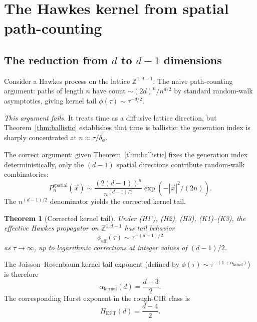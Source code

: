 \documentclass[11pt,a4paper]{article}
\newtheorem{theorem}{Theorem}
\begin{document}
\section{The Hawkes kernel from spatial path-counting}

\subsection{The reduction from $d$ to $d-1$ dimensions}

Consider a Hawkes process on the lattice $\mathbb{Z}^{1,d-1}$. The naive path-counting argument: paths of length $n$ have count $\sim (2d)^n/n^{d/2}$ by standard random-walk asymptotics, giving kernel tail $\phi(\tau) \sim \tau^{-d/2}$.

\emph{This argument fails.} It treats time as a diffusive lattice direction, but Theorem~\ref{thm:ballistic} establishes that time is ballistic: the generation index is sharply concentrated at $n \approx \tau/\delta_\phi$.

The correct argument: given Theorem~\ref{thm:ballistic} fixes the generation index deterministically, only the $(d-1)$ spatial directions contribute random-walk combinatorics:
\begin{equation}
P_n^{\mathrm{spatial}}(\vec{x}) \sim \frac{(2(d-1))^n}{n^{(d-1)/2}} \exp(-|\vec{x}|^2/(2n)).
\end{equation}
The $n^{(d-1)/2}$ denominator yields the corrected kernel tail.

\begin{theorem}[Corrected kernel tail]
\label{thm:tail}
Under (H1'), (H2), (H3), (K1)--(K3), the effective Hawkes propagator on $\mathbb{Z}^{1,d-1}$ has tail behavior
\begin{equation}
\phi_{\mathrm{eff}}(\tau) \sim \tau^{-(d-1)/2}
\end{equation}
as $\tau \to \infty$, up to logarithmic corrections at integer values of $(d-1)/2$.
\end{theorem}

The Jaisson--Rosenbaum kernel tail exponent (defined by $\phi(\tau) \sim \tau^{-(1+\alpha_{\mathrm{kernel}})}$) is therefore
\begin{equation}
\alpha_{\mathrm{kernel}}(d) = \frac{d-3}{2}.
\end{equation}
The corresponding Hurst exponent in the rough-CIR class \cite{JaissonRosenbaum2016} is
\begin{equation}
\boxed{H_{\mathrm{EPT}}(d) = \frac{d-4}{2}.}
\end{equation}
\end{document}
